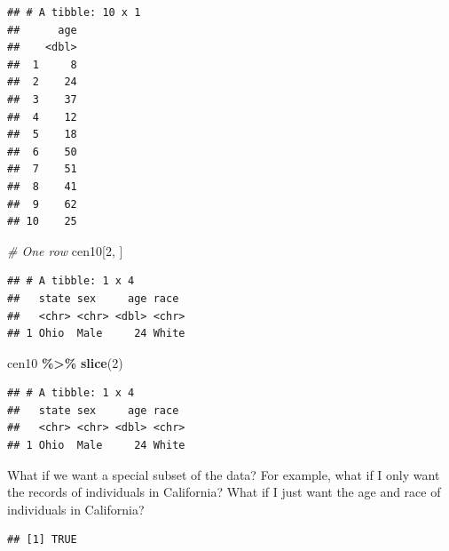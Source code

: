 \documentclass[
]{book}
\newenvironment{Shaded}{\begin{snugshade}}{\end{snugshade}}
\newcommand{\CommentTok}[1]{\textcolor[rgb]{0.56,0.35,0.01}{\textit{#1}}}
\newcommand{\DecValTok}[1]{\textcolor[rgb]{0.00,0.00,0.81}{#1}}
\newcommand{\KeywordTok}[1]{\textcolor[rgb]{0.13,0.29,0.53}{\textbf{#1}}}
\newcommand{\NormalTok}[1]{#1}
\newcommand{\OperatorTok}[1]{\textcolor[rgb]{0.81,0.36,0.00}{\textbf{#1}}}
\newcommand{\StringTok}[1]{\textcolor[rgb]{0.31,0.60,0.02}{#1}}
\theoremstyle{definition}
\theoremstyle{definition}
\theoremstyle{definition}
\theoremstyle{remark}
\begin{document}
\begin{verbatim}
## # A tibble: 10 x 1
##      age
##    <dbl>
##  1     8
##  2    24
##  3    37
##  4    12
##  5    18
##  6    50
##  7    51
##  8    41
##  9    62
## 10    25
\end{verbatim}

\begin{Shaded}
\begin{Highlighting}[]
\CommentTok{\# One row}
\NormalTok{cen10[}\DecValTok{2}\NormalTok{, ]}
\end{Highlighting}
\end{Shaded}

\begin{verbatim}
## # A tibble: 1 x 4
##   state sex     age race 
##   <chr> <chr> <dbl> <chr>
## 1 Ohio  Male     24 White
\end{verbatim}

\begin{Shaded}
\begin{Highlighting}[]
\NormalTok{cen10 }\OperatorTok{\%>\%}\StringTok{ }\KeywordTok{slice}\NormalTok{(}\DecValTok{2}\NormalTok{)}
\end{Highlighting}
\end{Shaded}

\begin{verbatim}
## # A tibble: 1 x 4
##   state sex     age race 
##   <chr> <chr> <dbl> <chr>
## 1 Ohio  Male     24 White
\end{verbatim}

What if we want a special subset of the data? For example, what if I only want the records of individuals in California? What if I just want the age and race of individuals in California?

\begin{Shaded}
\end{Shaded}

\begin{verbatim}
## [1] TRUE
\end{verbatim}
\end{document}
